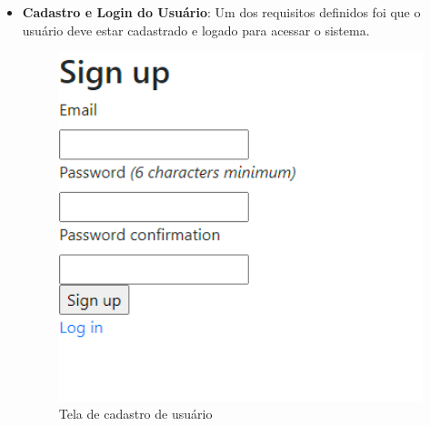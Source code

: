 \begin{itemize}
  \item \textbf{ Cadastro e Login do Usuário}:
        Um dos requisitos definidos foi que o usuário deve estar cadastrado e logado para acessar o sistema.

        \begin{figure}[H]
          \begin{center}
            \includegraphics[width=12cm]{Pictures/interface/signup.png}
            \caption{Tela de cadastro de usuário} \label{singup}
          \end{center}
        \end{figure}


\end{itemize}
